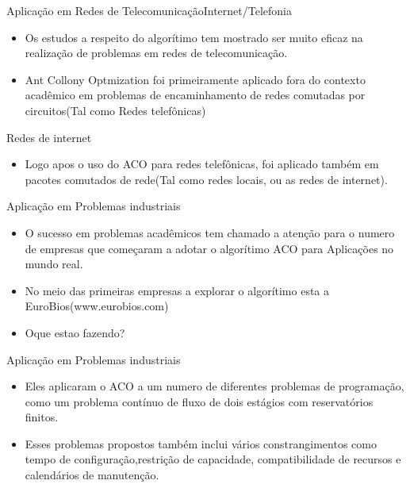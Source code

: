 \documentclass[compress]{beamer}
\begin{document}
\begin{frame}{Aplicação em Redes de Telecomunicação}{Internet/Telefonia}
  \begin{itemize}
  \item {
  Os estudos a respeito do algorítimo tem mostrado ser muito eficaz na realização de problemas em redes de telecomunicação.
  }
  \newline
  \item {
 Ant Collony Optmization foi primeiramente aplicado fora do contexto acadêmico em problemas de encaminhamento de redes comutadas por circuitos(Tal como Redes telefônicas)
  }
  \end{itemize}
\end{frame}


\begin{frame}{Redes de internet}
  \begin{itemize}
  \item {
Logo apos o uso do ACO para redes telefônicas, foi aplicado também em pacotes comutados de rede(Tal como redes locais, ou as redes de internet).
  }
  \end{itemize}
\end{frame}


\begin{frame}{Aplicação em Problemas industriais}
  \begin{itemize}
  \item {
  O sucesso em problemas acadêmicos tem chamado a atenção para o numero de empresas que começaram a adotar o algorítimo ACO para Aplicações no mundo real.
  }
  \newline
  \item {
 No meio das primeiras empresas a explorar o algorítimo esta a EuroBios(www.eurobios.com)}
  \newline
  \item{ Oque estao fazendo? }
  \end{itemize}
\end{frame}

\begin{frame}{Aplicação em Problemas industriais}
  \begin{itemize}
  \item {Eles aplicaram o ACO a um numero de diferentes problemas de programação, como um problema contínuo de fluxo de dois estágios com reservatórios finitos.}
  \newline
  \item{Esses problemas propostos também inclui vários constrangimentos como tempo de configuração,restrição de capacidade, compatibilidade de recursos e calendários de manutenção.}
  \end{itemize}
\end{frame}
\end{document}
